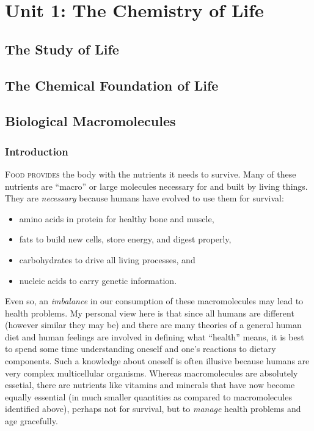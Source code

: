 \section{Unit 1: The Chemistry of Life}
\subsection{The Study of Life}
\subsection{The Chemical Foundation of Life}
\subsection{Biological Macromolecules}
\subsubsection{Introduction}
\lettrine[lines=2]{F}{ood provides} the body with the nutrients it needs to survive. Many of these nutrients are ``macro'' or large molecules necessary for and built by living things. They are \emph{necessary} because humans have evolved to use them for survival: 
\begin{itemize}
    \item amino acids in protein for healthy bone and muscle, 
    \item fats to build new cells, store energy, and digest properly, 
    \item carbohydrates to drive all living processes, and
    \item nucleic acids to carry genetic information.
\end{itemize}

Even so, an \emph{imbalance} in our consumption of these macromolecules may lead to health problems. My personal view here is that since all humans are different (however similar they may be) and there are many theories of a general human diet and human feelings are involved in defining what ``health'' means, it is best to spend some time understanding oneself and one's reactions to dietary components. Such a knowledge about oneself is often illusive because humans are very complex multicellular organisms. Whereas macromolecules are absolutely essetial, there are nutrients like vitamins and minerals that have now become equally essential (in much smaller quantities as compared to macromolecules identified above), perhaps not for survival, but to  \emph{manage} health problems and age gracefully.

